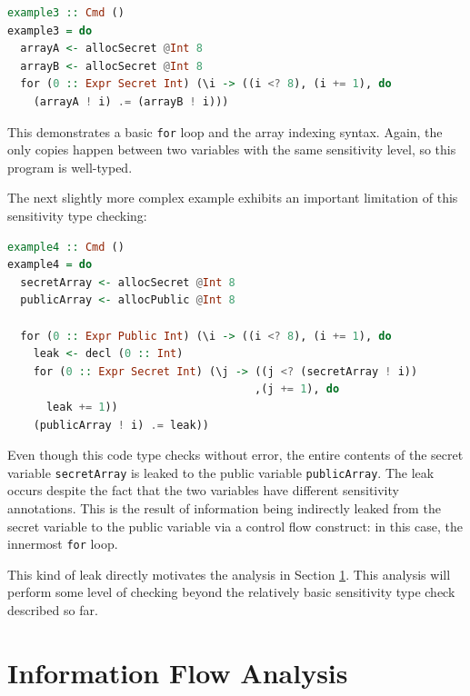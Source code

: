 \documentclass[10pt, conference]{IEEEtran}
\newcommand{\ttt}{\texttt}
\begin{document}
\begin{lstlisting}[language=Haskell]
example3 :: Cmd ()
example3 = do
  arrayA <- allocSecret @Int 8
  arrayB <- allocSecret @Int 8
  for (0 :: Expr Secret Int) (\i -> ((i <? 8), (i += 1), do
    (arrayA ! i) .= (arrayB ! i)))
\end{lstlisting}

\noindent This demonstrates a basic \ttt{for} loop and the array indexing syntax. Again, the
only copies happen between two variables with the same sensitivity level, so this
program is well-typed.

The next slightly more complex example exhibits an important limitation of this sensitivity type checking:

\begin{lstlisting}[language=Haskell]
example4 :: Cmd ()
example4 = do
  secretArray <- allocSecret @Int 8
  publicArray <- allocPublic @Int 8

  for (0 :: Expr Public Int) (\i -> ((i <? 8), (i += 1), do
    leak <- decl (0 :: Int)
    for (0 :: Expr Secret Int) (\j -> ((j <? (secretArray ! i))
                                      ,(j += 1), do
      leak += 1))
    (publicArray ! i) .= leak))
\end{lstlisting}

\noindent Even though this code type checks without error, the entire contents of the secret variable \ttt{secretArray} is leaked
to the public variable \ttt{publicArray}. The leak occurs despite the fact that the two variables have different
sensitivity annotations. This is the
result of information being indirectly leaked from the secret variable to the
public variable via a control flow construct: in this case, the innermost \ttt{for} loop.

This kind of leak directly motivates the analysis in Section \ref{sec:Analysis}. This analysis will perform
some level of checking beyond the relatively basic sensitivity type check described so far.

\section{Information Flow Analysis}
\label{sec:Analysis}
\end{document}
